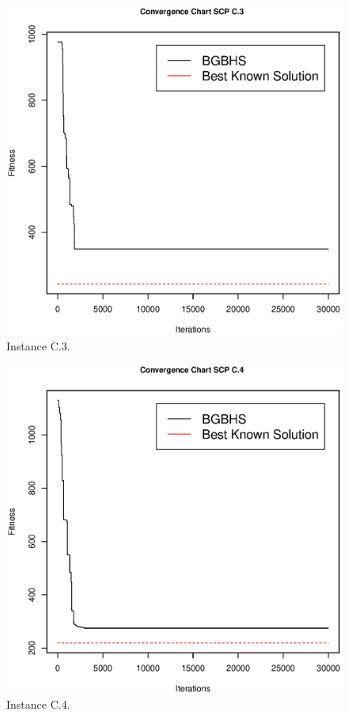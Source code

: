 \begin{figure}[]
\centering
\includegraphics[scale=.45]{Resultados/scpC3.eps}
\caption{Instance C.3.}
\label{fig:Instance.C.3}
\end{figure}

\begin{figure}[]
\centering
\includegraphics[scale=.45]{Resultados/scpC4.eps}
\caption{Instance C.4.}
\label{fig:Instance.C.4}
\end{figure}

